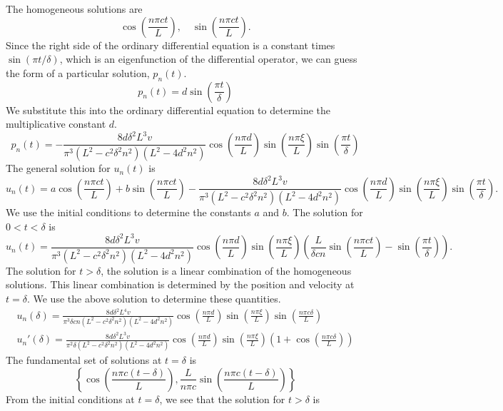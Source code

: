 {\begin{Solution}
  The homogeneous solutions are
  \[
  \cos\left( \frac{n \pi c t}{L} \right), \quad
  \sin\left( \frac{n \pi c t}{L} \right).
  \]
  Since the right side of the ordinary differential equation is a constant times
  $\sin(\pi t / \delta)$, which is an eigenfunction of the differential 
  operator, we can guess the form of a particular solution, $p_n(t)$.
  \[
  p_n(t) = d \sin\left( \frac{\pi t}{\delta} \right)
  \]
  We substitute this into the ordinary differential equation to determine the
  multiplicative constant $d$.
  \[
  p_n(t) = - \frac{8 d \delta^2 L^3 v}{\pi^3 (L^2 - c^2 \delta^2 n^2)
    (L^2 - 4 d^2 n^2) } \cos\left( \frac{n \pi d}{L} \right)
  \sin\left( \frac{n \pi \xi}{L} \right) 
  \sin\left( \frac{\pi t}{\delta} \right)
  \]
  The general solution for $u_n(t)$ is
  \[
  u_n(t) = a \cos\left( \frac{n \pi c t}{L} \right)
  + b \sin\left( \frac{n \pi c t}{L} \right)
  - \frac{8 d \delta^2 L^3 v}{\pi^3 (L^2 - c^2 \delta^2 n^2)
    (L^2 - 4 d^2 n^2) } \cos\left( \frac{n \pi d}{L} \right)
  \sin\left( \frac{n \pi \xi}{L} \right) 
  \sin\left( \frac{\pi t}{\delta} \right).
  \]
  We use the initial conditions to determine the constants $a$ and $b$.  The
  solution for $0 < t < \delta$ is
  \[
  u_n(t) = \frac{8 d \delta^2 L^3 v}{\pi^3 (L^2 - c^2 \delta^2 n^2)
    (L^2 - 4 d^2 n^2) } \cos\left( \frac{n \pi d}{L} \right)
  \sin\left( \frac{n \pi \xi}{L} \right) 
  \left( \frac{L}{\delta c n} \sin\left( \frac{n \pi c t}{L} \right)
    - \sin\left( \frac{\pi t}{\delta} \right) \right).
  \]
  The solution for $t > \delta$, the solution is a linear combination of
  the homogeneous solutions.  This linear combination is determined by
  the position and velocity at $t = \delta$.  We use the above solution to 
  determine these quantities.
  \begin{gather*}
    u_n(\delta) = \frac{8 d \delta^2 L^4 v}{\pi^3 \delta c n 
      (L^2 - c^2 \delta^2 n^2) (L^2 - 4 d^2 n^2) } 
    \cos\left( \frac{n \pi d}{L} \right)
    \sin\left( \frac{n \pi \xi}{L} \right) 
    \sin\left( \frac{n \pi c \delta}{L} \right) \\
    u_n'(\delta) = \frac{8 d \delta^2 L^3 v}{\pi^2 \delta (L^2 - c^2 \delta^2 n^2)
      (L^2 - 4 d^2 n^2) } \cos\left( \frac{n \pi d}{L} \right)
    \sin\left( \frac{n \pi \xi}{L} \right) 
    \left( 1 + \cos\left( \frac{n \pi c \delta}{L} \right) \right)
  \end{gather*}
  The fundamental set of solutions at $t = \delta$ is
  \[
  \left\{
    \cos\left( \frac{n \pi c(t - \delta)}{L} \right), 
    \frac{L}{n \pi c} \sin\left( \frac{n \pi c(t - \delta)}{L} \right)
  \right\}
  \]
  From the initial conditions at $t = \delta$, we see that the solution for
  $t > \delta$ is


\end{Solution}}
